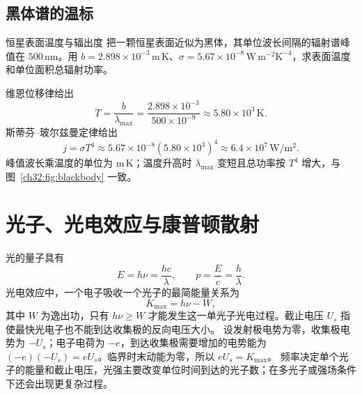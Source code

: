 
\subsection{黑体谱的温标}

\begin{origexamplebox}{恒星表面温度与辐出度}
把一颗恒星表面近似为黑体，其单位波长间隔的辐射谱峰值在 $500\,\mathrm{nm}$。用
$b=2.898\times10^{-3}\,\mathrm{m\,K}$、$\sigma=5.67\times10^{-8}\,\mathrm{W\,m^{-2}K^{-4}}$，求表面温度和单位面积总辐射功率。
\end{origexamplebox}
\begin{xesolution}

\begin{center}

\label{ch32:fig:blackbody}
\end{center}


维恩位移律给出
\[
 T=\frac b{\lambda_{\max}}
 =\frac{2.898\times10^{-3}}{500\times10^{-9}}
 \approx\boxed{5.80\times10^3\,\mathrm K}.
\]
斯蒂芬--玻尔兹曼定律给出
\[
 j=\sigma T^4\approx5.67\times10^{-8}(5.80\times10^3)^4
 \approx\boxed{6.4\times10^7\,\mathrm{W/m^2}}.
\]
峰值波长乘温度的单位为 $\mathrm{m\,K}$；温度升高时 $\lambda_{\max}$ 变短且总功率按 $T^4$ 增大，与图~\ref{ch32:fig:blackbody} 一致。
\end{xesolution}



\section{光子、光电效应与康普顿散射}

光的量子具有
\begin{equation}
 E=h\nu=\frac{hc}{\lambda},\qquad p=\frac E c=\frac h\lambda.
\end{equation}
光电效应中，一个电子吸收一个光子的最简能量关系为
\begin{equation}
 K_{\max}=h\nu-W,
\end{equation}
其中 $W$ 为逸出功，只有 $h\nu\ge W$ 才能发生这一单光子光电过程。截止电压 $U_s$ 指使最快光电子也不能到达收集极的反向电压大小。
设发射极电势为零，收集极电势为 $-U_s$；电子电荷为 $-e$，到达收集极需要增加的电势能为 $(-e)(-U_s)=eU_s$。临界时末动能为零，所以 $eU_s=K_{\max}$。
频率决定单个光子的能量和截止电压，光强主要改变单位时间到达的光子数；在多光子或强场条件下还会出现更复杂过程。

